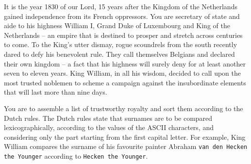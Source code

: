 





It is the year 1830 of our Lord, 15 years after the Kingdom of the Netherlands gained independence from its French oppressors.
You are secretary of state and aide to his highness William I, Grand Duke of Luxembourg and King of the Netherlands --
an empire that is destined to prosper and stretch across centuries to come.
To the King's utter dismay, rogue scoundrels from the south recently dared to defy his benevolent rule.
They call themselves Belgians and declared their own kingdom --
a fact that his highness will surely deny for at least another seven to eleven years.
King William, in all his wisdom, decided to call upon the most trusted noblemen to scheme a campaign against the insubordinate elements that will last more than nine days.

You are to assemble a list of trustworthy royalty and sort them according to the Dutch rules.
The Dutch rules state that surnames are to be compared lexicographically, according to the values of the ASCII characters, and considering only the part starting from the first capital letter.
For example, King William compares the surname of his favourite painter Abraham \texttt{van den Hecken the Younger} according to \texttt{Hecken the Younger}.


